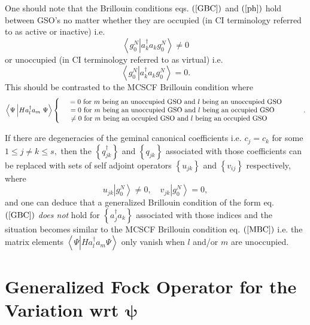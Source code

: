\documentclass[titlepage]{article}%
\begin{document}
One should note that the Brillouin conditions eqs. $\left(  \ref{GBC}\right)
$ and $\left(  \ref{ph}\right)  $ hold between GSO's no matter whether they
are occupied (in CI terminology referred to as active or inactive) i.e.
\begin{equation}
\left\langle g_{0}^{N}\left\vert a_{k}^{\dagger}a_{k}g_{0}^{N}\right.
\right\rangle \neq0
\end{equation}
or unoccupied (in CI terminology referred to as virtual) i.e.
\begin{equation}
\left\langle g_{0}^{N}\left\vert a_{k}^{\dagger}a_{k}g_{0}^{N}\right.
\right\rangle =0.
\end{equation}
This should be contrasted to the MCSCF Brillouin condition where
\begin{equation}
\left\langle \Psi\left\vert Ha_{l}^{\dagger}a_{m}\right.  \Psi\right\rangle
\left\{
\begin{array}
[c]{c}%
\quad=0\text{ for }m\text{ being an unoccupied GSO and }l\text{ being an
unoccupied GSO \quad\quad}\\
=0\text{ for }m\text{ being an unoccupied GSO and }l\text{ being an occupied
GSO \quad\quad}\\
\neq0\text{ for }m\text{ being an occupied GSO and }l\text{ being an occupied
GSO\quad\quad\quad\ }%
\end{array}
\right.  . \label{MBC}%
\end{equation}


If there are degeneracies of the geminal canonical coefficients i.e.
$c_{j}=c_{k}$ for some $1\leq j\neq k\leq s,$ then the $\left\{
q_{jk}^{\dagger}\right\}  $ and $\left\{  q_{jk}\right\}  $ associated with
those coefficients can be replaced \cite{Goscinski82a} with sets of self
adjoint operators $\left\{  u_{jk}\right\}  $ and $\left\{  v_{ij}\right\}  $
respectively, where
\begin{equation}
u_{jk}\left\vert g_{0}^{N}\right\rangle \neq0,\quad v_{jk}\left\vert g_{0}%
^{N}\right\rangle =0,
\end{equation}
and one can deduce that a generalized Brillouin condition of the form eq.
$\left(  \ref{GBC}\right)  $ \emph{does not} hold for $\left\{  a_{j}%
^{\dagger}a_{k}\right\}  $ associated with those indices and the situation
becomes similar to the MCSCF Brillouin condition eq. $\left(  \ref{MBC}%
\right)  $ i.e. the matrix elements $\left\langle \Psi\left\vert
Ha_{l}^{\dagger}a_{m}\right.  \Psi\right\rangle $ only vanish when $l$ and/or
$m$ are unoccupied.

\section{Generalized Fock Operator \label{Fock} for the Variation wrt
$\bm{\psi}$}
\end{document}
